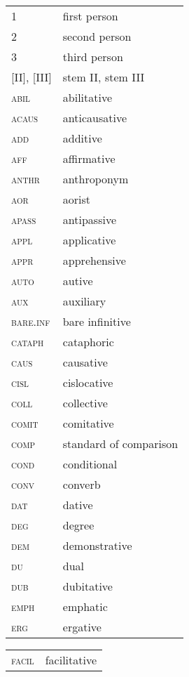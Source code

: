 
\begin{multicols}{2} 


\begin{tabular}{lp{4.5cm}} 
1	&	first person	\\
2	&	second person	\\
3	&	third person	\\
{[II]}, {[III]}	&	stem II, stem III	\\
\textsc{abil} 	&	abilitative	\\
\textsc{acaus} 	&	anticausative	\\
\textsc{add} 	&	additive	\\
\textsc{aff} 	&	affirmative	\\
\textsc{anthr} 	&	anthroponym	\\
\textsc{aor} 	&	aorist	\\
\textsc{apass} 	&	antipassive	\\
\textsc{appl} 	&	applicative	\\
\textsc{appr} 	&	apprehensive	\\
\textsc{auto} 	&	autive	\\
\textsc{aux} 	&	auxiliary	\\
\textsc{bare.inf} 	&	bare infinitive	\\
\textsc{cataph} 	&	cataphoric	\\
\textsc{caus} 	&	causative	\\
\textsc{cisl} 	&	cislocative	\\
\textsc{coll} 	&	collective	\\
\textsc{comit} 	&	comitative	\\
\textsc{comp} 	&	standard of comparison	\\
\textsc{cond} 	&	conditional	\\
\textsc{conv} 	&	converb	\\
\textsc{dat} 	&	dative	\\
\textsc{deg} 	&	degree	\\
\textsc{dem } 	&	demonstrative	\\
\textsc{du} 	&	dual	\\
\textsc{dub} 	&	dubitative	\\
	\textsc{emph} 	&	emphatic	\\
 	\textsc{erg} 	&	ergative	\\
\end{tabular}
%
\begin{tabular}{lp{4.5cm}}  
	\textsc{facil} 	&	facilitative	\\

\end{tabular}
\end{multicols}
